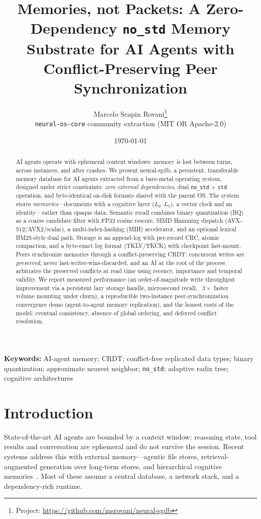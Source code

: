 \documentclass[11pt,twocolumn]{article}
\title{Memories, not Packets: A Zero-Dependency \texttt{no\_std} Memory
Substrate for AI Agents with Conflict-Preserving Peer Synchronization}
\author{Marcelo Scapin Rovani\thanks{Project: \url{https://github.com/msrovani/neural-sgdb}}
\\ \texttt{neural-os-core} community extraction (MIT OR Apache-2.0)}
\date{\today}
\newcommand{\neural}{{\sf neural-sgdb}}
\begin{document}
\maketitle

\begin{abstract}
AI agents operate with ephemeral context windows: memory is lost between
turns, across instances, and after crashes. We present \neural{}, a persistent,
transferable memory database for AI agents extracted from a bare-metal
operating system, designed under strict constraints: \emph{zero external
dependencies}, dual \texttt{no\_std} + \texttt{std} operation, and
byte-identical on-disk formats shared with the parent OS. The system stores
\emph{memories}---documents with a cognitive layer ($L_0$--$L_7$), a vector
clock and an identity---rather than opaque data. Semantic recall combines
binary quantization (BQ) as a coarse candidate filter with FP32 cosine
rescore, SIMD Hamming dispatch (AVX-512/AVX2/scalar), a multi-index-hashing
(MIH) accelerator, and an optional lexical BM25-style dual path. Storage is an
append-log with per-record CRC, atomic compaction, and a byte-exact log format
(TKLV/TKCK) with checkpoint fast-mount. Peers synchronize memories through a
conflict-preserving CRDT: concurrent writes are \emph{preserved}, never
last-writer-wins-discarded, and an AI at the root of the process arbitrates the
preserved conflicts at read time using recency, importance and temporal
validity. We report measured performance (an order-of-magnitude write
throughput improvement via a persistent lazy storage handle, microsecond
recall, ~$3\times$ faster volume mounting under churn), a reproducible
two-instance peer-synchronization convergence demo (agent-to-agent memory
replication), and the honest costs of the model: eventual consistency, absence
of global ordering, and deferred conflict resolution.
\end{abstract}

\begin{center}
\textbf{Keywords:} AI-agent memory; CRDT; conflict-free replicated data types;
binary quantization; approximate nearest neighbor; \texttt{no\_std}; adaptive
radix tree; cognitive architectures
\end{center}

\section{Introduction}
\label{sec:intro}

State-of-the-art AI agents are bounded by a context window: reasoning state,
tool results and conversation are ephemeral and do not survive the session.
Recent systems address this with external memory---agentic file stores,
retrieval-augmented generation over long-term stores, and hierarchical
cognitive memories~\cite{memgpt,letta,mem0,graphiti,contextual}. Most of these
assume a central database, a network stack, and a dependency-rich runtime.
\end{document}
